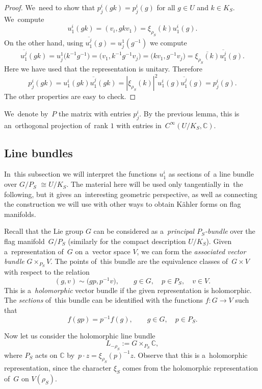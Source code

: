 \documentclass[pdftex]{sigma}
\numberwithin{equation}{section}
\newcommand{\bbC}{\mathbb{C}}
\newcommand{\weiS}{\rho_S}
\newcommand{\charS}{\xi_{\weiS}}
\begin{document}
\begin{proof}
We~need to show that $p^i_j(g k) = p^i_j(g)$ for all $g \in U$ and $k \in K_S$. We~compute
\[
u^i_1(g k) = (v_i, g k v_1) = \charS(k) u^i_1(g).
\]
On the other hand, using $\overline{u^j_1}(g) = {u^1_j}(g^{-1})$ we compute
\[
\overline{u^j_1}(g k) = {u^1_j}\big(k^{-1} g^{-1}\big) = \big(v_1, k^{-1} g^{-1} v_j\big) = \big(k v_1, g^{-1} v_j\big) = \overline{\charS(k)} \overline{u^j_1}(g).
\]
Here we have used that the representation is unitary. Therefore
\[
p^i_j(g k) = u^i_1(g k) \overline{u^j_1}(g k) = |\charS(k)|^2 u^i_1(g) \overline{u^j_1}(g) = p^i_j(g).
\]
The other properties are easy to check.
\end{proof}

We~denote by~$P$ the matrix with entries $p^i_j$.
By the previous lemma, this is an~orthogonal projection of~rank $1$ with entries in~$C^\infty(U / K_S, \bbC)$.

\subsection{Line bundles}

In~this subsection we will interpret the functions $u^i_1$ as sections of~a line bundle over $G / P_S$ $\cong U / K_S$.
The material here will be used only tangentially in~the following, but it gives an~inte\-res\-ting geometric perspective, as well as connecting the construction we will use with other ways to obtain K\"ahler forms on flag manifolds.

Recall that the Lie group $G$ can be considered as a~\emph{principal $P_S$-bundle} over the flag manifold~$G / P_S$ (similarly for the compact description $U / K_S$).
Given a~representation of~$G$ on a~vector space $V$, we can form the \emph{associated vector bundle} $G \times_{P_S} V$.
The points of~this bundle are the equivalence classes of~$G \times V$ with respect to the relation
\[
(g, v) \sim \big(g p, p^{-1} v\big), \qquad
g \in G, \quad p \in P_S, \quad v \in V.
\]
This is a~\emph{holomorphic} vector bundle if the given representation is holomorphic.
The \emph{sections} of~this bundle can be identified with the functions $f\colon G \to V$ such that
\[
f(g p) = p^{-1} f(g), \qquad g \in G, \quad p \in P_S.
\]

Now let us consider the holomorphic line bundle
\[
L_{-\rho_S} := G \times_{P_S} \bbC,
\]
where $P_S$ acts on $\bbC$ by~$p \cdot z = \charS(p)^{-1} z$.
Observe that this is a~holomorphic representation, since the character $\xi_S$ comes from the holomorphic representation of~$G$ on $V(\rho_S)$.
\end{document}
